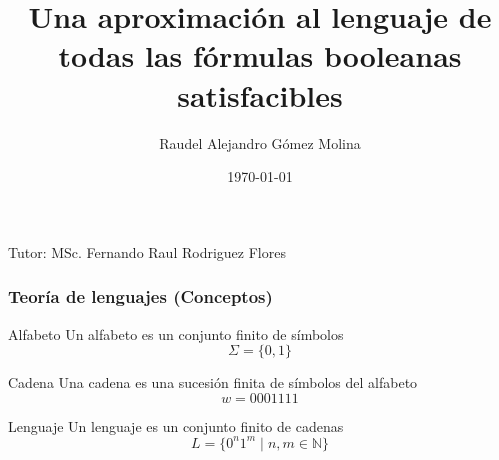 \documentclass{beamer}
\title{Una aproximación al lenguaje de todas las fórmulas booleanas satisfacibles}
\author{Raudel Alejandro Gómez Molina}
\institute{Facultad de Matemática y Computación \\ Universidad de La Habana}
\date{\today}
\newcommand{\tutor}{MSc. Fernando Raul Rodriguez Flores} %
\begin{document}
\begin{frame}
    \titlepage
    \vspace{1cm} %
    \begin{center}
        Tutor: \tutor \\ %
        \smallskip
    \end{center}
\end{frame}

\begin{frame}
    \frametitle{Teoría de lenguajes (Conceptos)}
    
    \begin{block}{Alfabeto}
        Un alfabeto es un conjunto finito de símbolos
        $$\Sigma=\{0,1\}$$
    \end{block}
    
    \pause
    
    \begin{block}{Cadena}
        Una cadena es una sucesión finita de símbolos del alfabeto
        $$w=0001111$$
    \end{block}
    
    \pause
    
    \begin{block}{Lenguaje}
        Un lenguaje es un conjunto finito de cadenas
        $$L=\{0^n1^m\mid n,m\in \mathbb{N}\}$$
    \end{block}
\end{frame}
\end{document}
